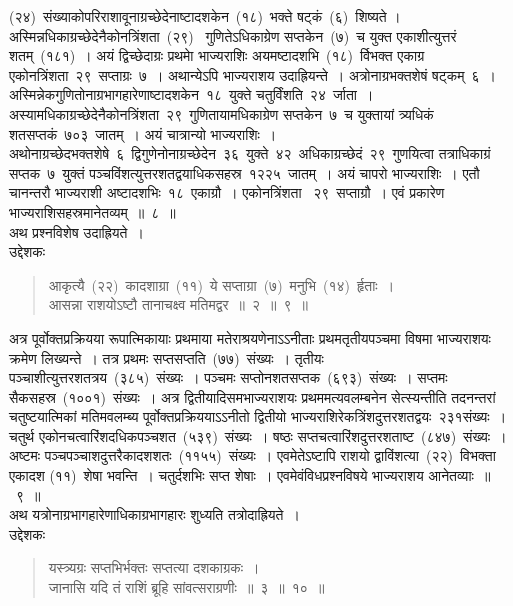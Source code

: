 \documentclass[11pt, openany]{book}
\begin{document}
\newpage
\thispagestyle{fancy}
\fancyhf{}
\noindent
(२४)~संख्याकोपरिराशावूनाग्रच्छेदेनाष्टादशकेन~(१८)~भक्ते षट्कं~(६)~शिष्यते । अस्मिन्नधिकाग्रच्छेदेनैकोनत्रिंशता~(२९)~ गुणितेऽधिकाग्रेण सप्तकेन~(७)~च युक्त एकाशीत्युत्तरं शतम्~(१८१)~। अयं द्विच्छेदाग्रः प्रथमाे भाज्यराशिः अयमष्टादशभि~(१८)~र्विभक्त एकाग्र एकोनत्रिंशता~२९~सप्ताग्रः~७~। अथान्येऽपि भाज्यराशय उदाह्रियन्ते~। अत्रोनाग्रभक्तशेषं षट्कम्~६~। अस्मिन्नेकगुणितोनाग्रभागहारेणाष्टादशकेन~१८~युक्ते चतुर्विंशति~२४~र्जाता~।
अस्यामधिकाग्रच्छेदेनैकोनत्रिंशता~२९~गुणितायामधिकाग्रेण सप्तकेन~७~च युक्तायां त्र्यधिकं शतसप्तकं~७०३~जातम्~। अयं चात्रान्यो भाज्यराशिः~। अथोनाग्रच्छेदभक्तशेषे~६~द्विगुणेनोनाग्रच्छेदेन~३६~युक्ते~४२~अधिकाग्रच्छेदं~२९~गुणयित्वा तत्राधिकाग्रं सप्तक~७~युक्तं पञ्चविंशत्युत्तरशतद्वयाधिकसहस्र~१२२५~जातम्~। अयं चापरो भाज्यराशिः~। एतौ चानन्तरौ भाज्यराशी अष्टादशभिः~१८~एकाग्रौ~। एकोनत्रिंशता ~२९~सप्ताग्रौ~। एवं प्रकारेण भाज्यराशिसहस्रमानेतव्यम्~॥~८~॥\\
\indent
अथ प्रश्नविशेष उदाह्रियते~।\\ 
उद्देशकः \textendash
\begin{quote}
{\ku
आकृत्यै~(२२)~कादशाग्रा~(११)~ये सप्ताग्रा~(७)~मनुभि~(१४)~र्हृताः~।\\
आसन्ना राशयोऽष्टौ तानाचक्ष्व मतिमद्वर~॥~२~॥~९~॥}
\end{quote}

\indent
अत्र पूर्वोक्तप्रक्रियया रूपात्मिकायाः प्रथमाया मतेराश्रयणेनाऽऽनीताः प्रथमतृतीयपञ्चमा विषमा भाज्यराशयः क्रमेण लिख्यन्ते~। तत्र प्रथमः सप्तसप्तति~(७७)~संख्यः~। तृतीयः पञ्चाशीत्युत्तरशतत्रय~(३८५)~संख्यः~। पञ्चमः सप्तोनशतसप्तक~(६९३)~संख्यः~। सप्तमः सैकसहस्र~(१००१)~संख्यः~। अत्र द्वितीयादिसमभाज्यराशयः प्रथममत्यवलम्बनेन सेत्स्यन्तीति तदनन्तरां चतुष्टयात्मिकां मतिमवलम्ब्य पूर्वोक्तप्रक्रिययाऽऽनीतो द्वितीयो भाज्यराशिरेकत्रिंशदुत्तरशतद्वयः~२३१संख्यः~। चतुर्थ एकोनचत्वारिंशदधिकपञ्चशत~(५३९)~संख्यः~। षष्ठः सप्तचत्वारिंशदुत्तरशताष्ट~(८४७)~संख्यः~। अष्टमः पञ्चपञ्चाशदुत्तरैकादशशतः~(११५५)~संख्यः~। एवमेतेऽष्टापि
राशयो द्वाविंशत्या~(२२)~विभक्ता एकादश (११)~शेषा भवन्ति~। चतुर्दशभिः सप्त शेषाः~। एवमेवंविधप्रश्नविषये भाज्यराशय आनेतव्याः~॥~९~॥\\

\indent
अथ यत्रोनाग्रभागहारेणाधिकाग्रभागहारः शुध्यति तत्रोदाह्रियते~।\\
उद्देशकः \textendash
\begin{quote}
{\ku
यस्त्र्यग्रः सप्तभिर्भक्तः सप्तत्या दशकाग्रकः~।\\
जानासि यदि तं राशिं ब्रूहि सांवत्सराग्रणीः~॥~३~॥~१०~॥}
\end{quote}
\end{document}
